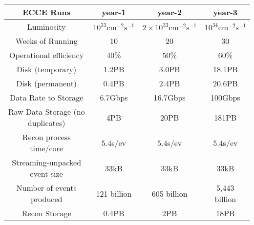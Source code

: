 \begin{table}[htb!]
    \hskip-0.8cm
    \begin{tabular}{c|c|c|c}
        \hline
         \textbf{ECCE Runs}       & year-1                & year-2                  & year-3                \\
        \hline
         Luminosity              & $10^{33}\mathrm{cm}^{-2}\mathrm{s}^{-1}$ & $2\times 10^{33}\mathrm{cm}^{-2}\mathrm{s}^{-1}$ & $10^{34}\mathrm{cm}^{-2}\mathrm{s}^{-1}$ \\
         Weeks of Running        & 10                    & 20                      & 30                    \\
         Operational efficiency    & 40\%                  & 50\%                    & 60\%                  \\
        Disk (temporary)  &  1.2PB & 3.0PB & 18.1PB \\
        Disk (permanent)    & 0.4PB & 2.4PB &	20.6PB \\
         Data Rate to Storage    & 6.7Gbps               & 16.7Gbps                & 100Gbps               \\
         Raw Data Storage (no duplicates) & 4PB          & 20PB                    & 181PB                 \\
        \hline
        Recon process time/core	& 5.4s/ev	& 5.4s/ev	& 5.4s/ev \\
        Streaming-unpacked event size	& 33kB	& 33kB & 33kB \\
        Number of events produced &	121 billion	& 605 billion & 5,443 billion \\
         Recon Storage          & 0.4PB                  & 2PB                    & 18PB                   \\

\end{tabular}
\end{table}
